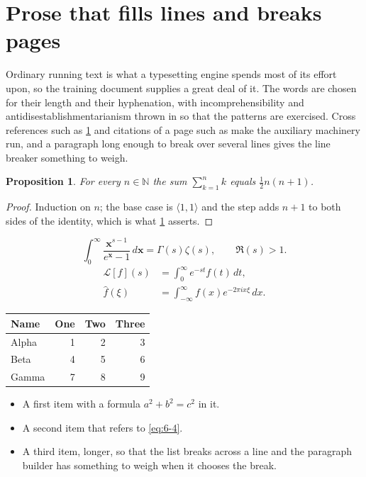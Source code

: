 \documentclass[11pt,a4paper]{report}
\theoremstyle{plain}
\newtheorem{proposition}{Proposition}[chapter]
\newcommand{\vecn}[1]{\mathbf{#1}}
\newcommand{\pairs}[2]{\langle #1,#2\rangle}
\begin{document}
\section{Prose that fills lines and breaks pages}
\label{sec:prose6-4}
Ordinary running text is what a typesetting engine spends most of its effort
upon, so the training document supplies a great deal of it. The words are
chosen for their length and their hyphenation, with incomprehensibility and
antidisestablishmentarianism thrown in so that the patterns are exercised.
Cross references such as \cref{sec:prose6-4} and citations of a page such
as \pageref{sec:prose6-4} make the auxiliary machinery run, and a
paragraph long enough to break over several lines gives the line breaker
something to weigh.
\begin{proposition}\label{prop:6-4}
For every $n\in\mathbb{N}$ the sum $\sum_{k=1}^{n}k$ equals
$\tfrac{1}{2}n(n+1)$.
\end{proposition}
\begin{proof}
Induction on $n$; the base case is $\pairs{1}{1}$ and the step adds $n+1$ to
both sides of the identity, which is what \cref{prop:6-4} asserts.
\end{proof}
\begin{equation}\label{eq:6-4}
  \int_{0}^{\infty}\frac{\vecn{x}^{s-1}}{e^{\vecn{x}}-1}\,d\vecn{x}
    = \Gamma(s)\zeta(s),\qquad \Re(s)>1 .
\end{equation}
\begin{align}
  \mathcal{L}[f](s) &= \int_{0}^{\infty} e^{-st} f(t)\,dt, \\
  \widehat{f}(\xi)  &= \int_{-\infty}^{\infty} f(x) e^{-2\pi i x\xi}\,dx .
\end{align}
\par\noindent\begin{center}
\begin{tabular}{lrrr}
\hline
Name & One & Two & Three \\
\hline
Alpha & 1 & 2 & 3 \\
Beta & 4 & 5 & 6 \\
Gamma & 7 & 8 & 9 \\
\hline
\end{tabular}
\end{center}
\begin{itemize}
  \item A first item with a formula $a^2+b^2=c^2$ in it.
  \item A second item that refers to \eqref{eq:6-4}.
  \item A third item, longer, so that the list breaks across a line and the
    paragraph builder has something to weigh when it chooses the break.
\end{itemize}
\end{document}
